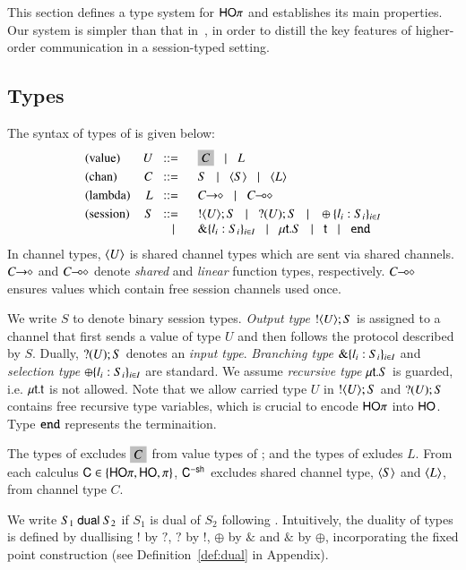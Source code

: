 This section defines a type system for
$\mathsf{HO}\pi$ and establishes its main properties. 
Our system is simpler than that in~\cite{tlca07,mostrous_phd}, in order to distill the key
features of higher-order communication in a session-typed setting.

\subsection{Types}
\label{subsec:types}
The syntax of types of \HOp is given below: 
\[
\begin{array}{lrl}
\text{(value)}	& U \bnfis &	\nonhosyntax{C} \bnfbar L\\[1mm]  %
\text{(chan)}   & C  \bnfis &	S \bnfbar \chtype{S}\bnfbar \chtype{L}
	\\[1mm]
\text{(lambda)} & L \bnfis &	\shot{C} \bnfbar \lhot{C}
	\\[1mm]
\text{(session)} &  S \bnfis & 	\btout{U} S \bnfbar \btinp{U} S 
\bnfbar \btsel{l_i:S_i}_{i \in I} \\ 
 & \bnfbar & \btbra{l_i:S_i}_{i \in I}
	  \bnfbar  \trec{t}{S} \bnfbar \vart{t}  \bnfbar \tinact
\end{array}
\]
In channel types, $\langle U \rangle$ is shared channel types 
which are sent via shared channels. 
$C\!\! \rightarrow\!\! \diamond$ and $C\!\! \multimap\!\! \diamond$ denote
{\em shared} and {\em linear} function types, respectively.
$C\!\! \multimap\!\! \diamond$ \cite{tlca07,mostrous_phd} ensures values which contain free 
session channels used once. 
 
We write $S$ to denote binary session types.  {\em Output type}
$! \langle U \rangle ; S$ is assigned to a channel that first sends a value of
type $U$ and then follows the protocol described by $S$.  Dually,
$? (U) ; S$ denotes an {\em input type}.  {\em Branching type}
$\& \{l_i:S_i\}_{i \in I}$ and {\em selection type}
$\oplus \{l_i:S_i\}_{i \in I}$ are standard.  We assume {\em recursive
  type} $\mu\mathsf{t}.S$ is guarded, i.e.  $\mu\mathsf{t}.\mathsf{t}$ is not
allowed.  Note that we allow carried type $U$ in $! \langle U \rangle ; S$ and
$? (U) ; S$ contains free recursive type variables, which is crucial
to encode $\mathsf{HO}\pi$ into $\mathsf{HO}$. Type $\mathtt{end}$ represents the
terminaition. 

The types of \HO excludes $\nonhosyntax{C}$ from 
value types of \HOp; and the types of \sessp exludes $L$. 
From each calculus $\mathsf{C} \in \{\mathsf{HO}\pi, \mathsf{HO}, \pi \}$, $\mathsf{C}^{-\mathsf{sh}}$ 
excludes shared channel type, $\langle S \rangle$ and $\langle L \rangle$, 
from channel type $C$.

We write $S_1 \ \mathsf{dual}\  S_2$ if 
$S_1$ is dual of $S_2$ following \cite{TGC14}.  
Intuitively, 
the duality of types is defined by 
duallising $!$ by $?$, $?$ by $!$, $\oplus$ by $\&$ and $\&$ by $\oplus$,  
incorporating the fixed point construction 
(see Definition~\ref{def:dual} in Appendix). 

